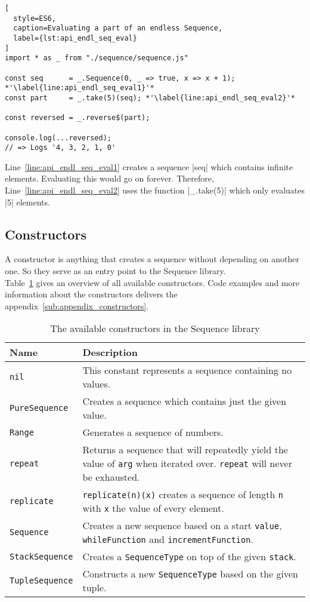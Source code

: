 \begin{lstlisting}[
  style=ES6,
  caption=Evaluating a part of an endless Sequence,
  label={lst:api_endl_seq_eval}
]
import * as _ from "./sequence/sequence.js"

const seq      = _.Sequence(0, _ => true, x => x + 1); *'\label{line:api_endl_seq_eval1}'*
const part     = _.take(5)(seq); *'\label{line:api_endl_seq_eval2}'*

const reversed = _.reverse$(part);

console.log(...reversed);
// => Logs '4, 3, 2, 1, 0'
\end{lstlisting}

Line~\ref{line:api_endl_seq_eval1} creates a sequence |seq| which contains
infinite elements. Evaluating this would go on forever. Therefore,
Line~\ref{line:api_endl_seq_eval2} uses the function |_.take(5)| which only
evaluates |5| elements.

\subsection{Constructors} %
\label{sub:api_Constructors}
A constructor is anything that creates a sequence without depending on another
one. So they serve as an entry point to the Sequence library. \\
Table~\ref{tab:api_ctors} gives an overview of all available constructors. Code
examples and more information about the constructors delivers the
appendix~\ref{sub:appendix_constructors}.

\begin{table}[H]
  \centering
  \begin{tabularx}{\textwidth}{| l | X |} \hline
    \textbf{Name} & \textbf{Description} \\ \hline
    \texttt{nil} & This constant represents a sequence containing no values. \\ \hline
    \texttt{PureSequence} & Creates a sequence which contains just the given value. \\ \hline
    \texttt{Range} & Generates a sequence of numbers. \cite{wild_ip5_2023} \\ \hline
    \texttt{repeat} & Returns a sequence that will repeatedly yield the value of \texttt{arg} when iterated over. \texttt{repeat} will never be exhausted. \\ \hline
    \texttt{replicate} & \texttt{replicate(n)(x)} creates a sequence of length \texttt{n} with \texttt{x} the value of every element. \\ \hline
    \texttt{Sequence} & Creates a new sequence based on a start \texttt{value}, \texttt{whileFunction} and \texttt{incrementFunction}. \\ \hline
    \texttt{StackSequence} & Creates a \texttt{SequenceType} on top of the given \texttt{stack}. \\ \hline
    \texttt{TupleSequence} & Constructs a new \texttt{SequenceType} based on the given tuple. \\ \hline
  \end{tabularx}
  \caption{The available constructors in the Sequence library}
  \label{tab:api_ctors}
\end{table}


